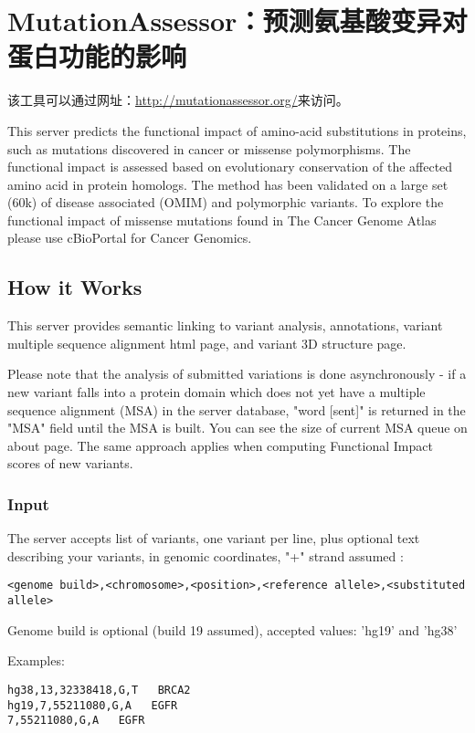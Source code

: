 \section{MutationAssessor：预测氨基酸变异对蛋白功能的影响}

该工具可以通过网址：\url{http://mutationassessor.org/}来访问。

This server predicts the functional impact of amino-acid substitutions in proteins, such as mutations discovered in cancer or missense polymorphisms. The functional impact is assessed based on evolutionary conservation of the affected amino acid in protein homologs. The method has been validated on a large set (60k) of disease associated (OMIM) and polymorphic variants. To explore the functional impact of missense mutations found in The Cancer Genome Atlas please use cBioPortal for Cancer Genomics.

\subsection{How it Works}

This server provides semantic linking to variant analysis, annotations, variant multiple sequence alignment html page, and variant 3D structure page. 

Please note that the analysis of submitted variations is done asynchronously - if a new variant falls into a protein domain which does not yet have a multiple sequence alignment (MSA) in the server database, "word [sent]" is returned in the "MSA" field until the MSA is built. You can see the size of current MSA queue on about page. The same approach applies when computing Functional Impact scores of new variants. 

\subsubsection{Input}
The server accepts list of variants, one variant per line, plus optional text describing your variants, in genomic coordinates, "+" strand assumed : 

\begin{verbatim}
<genome build>,<chromosome>,<position>,<reference allele>,<substituted allele> 
\end{verbatim}

Genome build is optional (build 19 assumed), accepted values: 'hg19' and 'hg38' 

Examples: 

\begin{verbatim}
hg38,13,32338418,G,T   BRCA2 
hg19,7,55211080,G,A   EGFR 
7,55211080,G,A   EGFR 
\end{verbatim}


